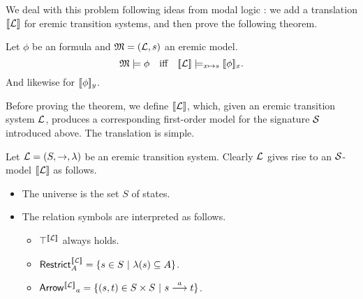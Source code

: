 We deal with this problem following ideas from modal logic
\cite{BlackburnP:modlog}: we add a translation $\lbrack\!\lbrack \mathcal{L} \rbrack\!\rbrack$ for
eremic transition systems, and then prove the following theorem.

\begin{theorem}\label{correspondence:theorem:1}
Let $\phi$ be an \ELABR{} formula and $\frak{M} = (\mathcal{L}, s)$ an eremic
model.
\[
   \frak{M} \models \phi \quad  \text{iff} \quad \lbrack\!\lbrack \mathcal{L} \rbrack\!\rbrack \models_{x \mapsto s} \lbrack\!\lbrack \phi \rbrack\!\rbrack_x.
\]
And likewise for $\lbrack\!\lbrack \phi \rbrack\!\rbrack_y$.
\end{theorem}

\NI Before proving the theorem, we define $\lbrack\!\lbrack \mathcal{L} \rbrack\!\rbrack$, which, given
an eremic transition system $\mathcal{L}$, produces a corresponding
first-order model for the signature $\mathcal{S}$ introduced above. The
translation is simple.

\begin{definition}
Let $\mathcal{L} = (S, \rightarrow, \lambda)$ be an eremic transition
system. Clearly $\mathcal{L}$ gives rise to an $\mathcal{S}$-model $\lbrack\!\lbrack \mathcal{L} \rbrack\!\rbrack$ as
follows.
\begin{itemize}

\item The universe is the set $S$ of states.

\item The relation symbols are interpreted as follows.

  \begin{itemize}

    \item $\top^{\lbrack\!\lbrack \mathcal{L} \rbrack\!\rbrack}$ always holds.

    \item $\mathsf{Restrict}_{A}^{\lbrack\!\lbrack \mathcal{L} \rbrack\!\rbrack} = \{ s \in S\ |\ \lambda(s) \subseteq A\}$.

    \item $\mathsf{Arrow^{\lbrack\!\lbrack \mathcal{L} \rbrack\!\rbrack}}_{a} = \{(s, t) \in S \times S\ |\ s \stackrel{a}{\longrightarrow} t\}$.

  \end{itemize}
\end{itemize}
\end{definition}

